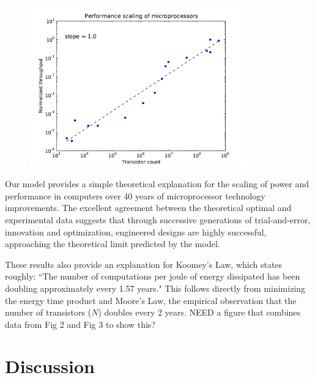 \documentclass[12pt]{article}
\begin{document}
\begin{figure}[!h]
\centering
\includegraphics[height=70mm]{Figures/throughput_scaling.pdf}
\caption{}
\label{fig:throughput}
\end{figure}

Our model provides a simple theoretical explanation for the scaling of power
and performance in computers over 40 years of microprocessor technology
improvements.  The excellent agreement between the theoretical optimal and
experimental data suggests that through successive generations of
trial-and-error, innovation and optimization, engineered designs are highly
successful, approaching the theoretical limit predicted by the model.

These results also provide an explanation for Koomey's Law, which states
roughly: ``The number of computations per joule of energy dissipated has been
doubling approximately every 1.57 years." This follows directly from minimizing
the energy time product and Moore's Law, the empirical observation that the
number of transistors ($N$) doubles every 2 years. NEED a figure that combines
data from Fig 2 and Fig 3 to show this?

\section{Discussion}
\end{document}
